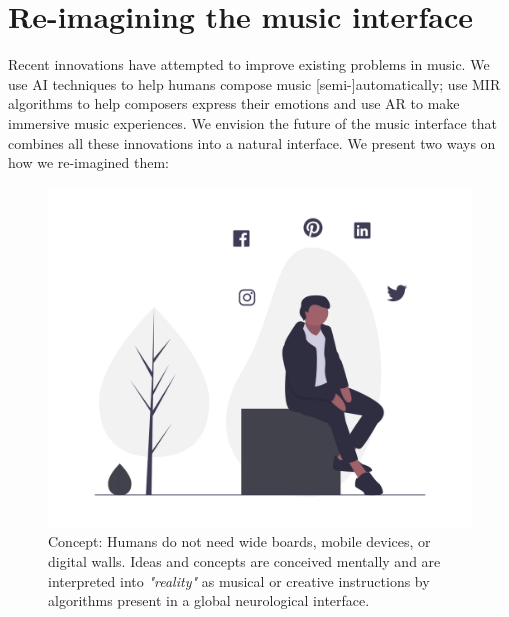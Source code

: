 \documentclass[acmtog]{acmart}
\begin{document}

\section{Re-imagining the music interface}
Recent innovations have attempted to improve existing problems in music. We use AI techniques to help humans compose music [semi-]automatically; use MIR algorithms to help composers express their emotions and use AR to make immersive music experiences. We envision the future of the music interface that combines all these innovations into a natural interface. We present two ways on how we re-imagined them: 

\begin{figure}[h]
  \centering
  \includegraphics[width=\linewidth]{acmart-master-2/samples/thinkbnw.png}
  \caption{Concept: Humans do not need wide boards, mobile devices, or digital walls. Ideas and concepts are conceived mentally and are interpreted into \textit{"reality"} as musical or creative instructions by algorithms present in a global neurological interface. }
\end{figure}
\end{document}
